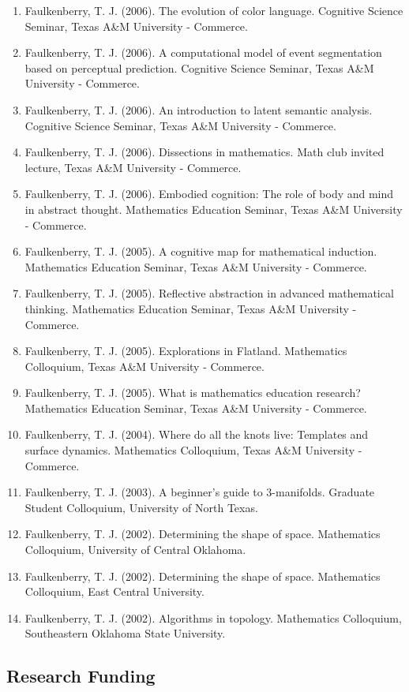 \documentclass[article,10pt]{article}
\begin{document}
\begin{enumerate}
\item Faulkenberry, T. J. (2006). The evolution of color language. Cognitive Science Seminar, Texas A\&M University - Commerce.
\item Faulkenberry, T. J. (2006). A computational model of event segmentation based on perceptual prediction. Cognitive Science Seminar, Texas A\&M University - Commerce.
\item Faulkenberry, T. J. (2006). An introduction to latent semantic analysis. Cognitive Science Seminar, Texas A\&M University - Commerce.
\item Faulkenberry, T. J. (2006). Dissections in mathematics. Math club invited lecture, Texas A\&M University - Commerce.
\item Faulkenberry, T. J. (2006). Embodied cognition: The role of body and mind in abstract thought. Mathematics Education Seminar, Texas A\&M University - Commerce.
\item Faulkenberry, T. J. (2005). A cognitive map for mathematical induction. Mathematics Education Seminar, Texas A\&M University - Commerce.
\item Faulkenberry, T. J. (2005). Reflective abstraction in advanced mathematical thinking. Mathematics Education Seminar, Texas A\&M University - Commerce.
\item Faulkenberry, T. J. (2005). Explorations in Flatland. Mathematics Colloquium, Texas A\&M University - Commerce.
\item Faulkenberry, T. J. (2005). What is mathematics education research? Mathematics Education Seminar, Texas A\&M University - Commerce.
\item Faulkenberry, T. J. (2004). Where do all the knots live: Templates and surface dynamics. Mathematics Colloquium, Texas A\&M University - Commerce.
\item Faulkenberry, T. J. (2003). A beginner’s guide to 3-manifolds. Graduate Student Colloquium, University of North Texas.
\item Faulkenberry, T. J. (2002). Determining the shape of space. Mathematics Colloquium, University of Central Oklahoma.
\item Faulkenberry, T. J. (2002). Determining the shape of space. Mathematics Colloquium, East Central University.
\item Faulkenberry, T. J. (2002). Algorithms in topology. Mathematics Colloquium, Southeastern Oklahoma State University.
\end{enumerate}

\subsection*{Research Funding}
\label{sec:orgd2eb528}
\end{document}
